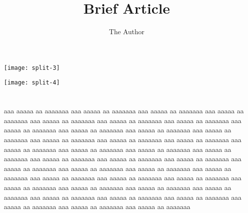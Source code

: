 \documentclass[11pt, oneside]{article}   	%
\title{Brief Article}
\author{The Author}
\begin{document}
\centering
\begin{minipage}{0.33\textwidth}
   \texttt{[image: split-3]}%
\end{minipage}
\hspace{-3mm}
\begin{minipage}{0.33\textwidth}
   \texttt{[image: split-4]} 
\end{minipage}


\section{}
aaa aaaaa aa aaaaaaa aaa aaaaa aa aaaaaaa aaa aaaaa aa aaaaaaa aaa aaaaa aa aaaaaaa aaa aaaaa aa aaaaaaa aaa aaaaa aa aaaaaaa aaa aaaaa aa aaaaaaa aaa aaaaa aa aaaaaaa aaa aaaaa aa aaaaaaa aaa aaaaa aa aaaaaaa aaa aaaaa aa aaaaaaa aaa aaaaa aa aaaaaaa aaa aaaaa aa aaaaaaa aaa aaaaa aa aaaaaaa aaa aaaaa aa aaaaaaa aaa aaaaa aa aaaaaaa aaa aaaaa aa aaaaaaa aaa aaaaa aa aaaaaaa aaa aaaaa aa aaaaaaa aaa aaaaa aa aaaaaaa aaa aaaaa aa aaaaaaa aaa aaaaa aa aaaaaaa aaa aaaaa aa aaaaaaa aaa aaaaa aa aaaaaaa aaa aaaaa aa aaaaaaa aaa aaaaa aa aaaaaaa aaa aaaaa aa aaaaaaa aaa aaaaa aa aaaaaaa aaa aaaaa aa aaaaaaa aaa aaaaa aa aaaaaaa aaa aaaaa aa aaaaaaa aaa aaaaa aa aaaaaaa aaa aaaaa aa aaaaaaa aaa aaaaa aa aaaaaaa aaa aaaaa aa aaaaaaa aaa aaaaa aa aaaaaaa aaa aaaaa aa aaaaaaa aaa aaaaa aa aaaaaaa 



%
\end{document}

